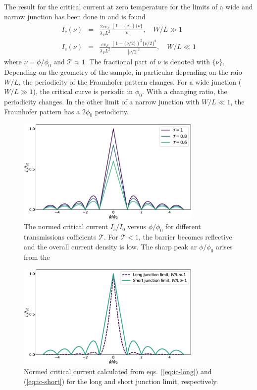 The result for the critical current at zero temperature for the limits of a wide and narrow junction has been done in\cite{Barzykin1999} and is found
\begin{eqnarray}
I_c(\nu) &=& \frac{2 e v_F }{\lambda_F L^2}\frac{( 1- \{ \nu \}) \{ \nu \} }{|\nu|}, \quad W/L \gg 1 \label{eq:ic-short}\\
I_c(\nu) &=& \frac{e v_F }{\lambda_F L^2}\frac{( 1- \{ \nu/2  \})^2 \{ \nu/2 \}^2 }{|\nu/2|^2}, \quad W/L \ll 1 \label{eq:ic-long}
\end{eqnarray}
where $\nu = \phi / \phi_0 $ and $\mathcal{T} \approx 1$. The fractional part of $\nu$ is denoted with $\{ \nu \}$. Depending on the geometry of the sample, in particular depending on the raio $W/L$, the periodicity of the Fraunhofer pattern changes. For a wide junction ($W/L \gg 1$), the critical curve is periodic in $\phi_0$. With a changing ratio, the periodicity changes. In the other limit of a narrow junction with  $W/L \ll 1$, the Fraunhofer pattern has a $2\phi_0$ periodicity.
\begin{figure}
\centering
\includegraphics[width=0.8\textwidth]{figure/analyticalmodel/ic_vs_tau}
\caption{The normed critical current $I_c/I_0$ versus $\phi / \phi_0$ for different transmissions cofficients $\mathcal{T}$. For $\mathcal{T} < 1$, the barrier becomes reflective and the overall current density is low. The sharp peak ar $\phi / \phi_0$ arises from the  }
\end{figure}
\begin{figure}
\centering
\includegraphics[width=0.8\textwidth]{figure/analyticalmodel/ic-long-vs-short}
\caption{Normed critical current calculated from eqs. (\ref{eq:ic-long}) and (\ref{eq:ic-short}) for the long and short junction limit, respectively. }
\end{figure}

